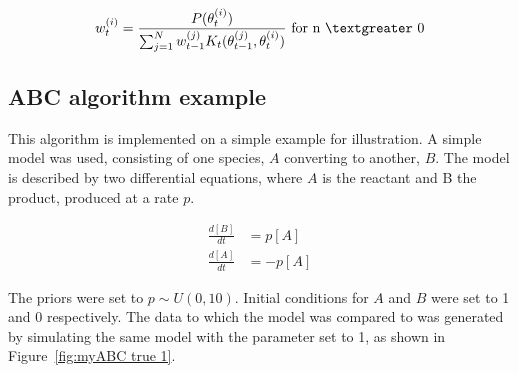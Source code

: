 \begin{align}
w_{t}^{(i)} = \frac{P(\theta_{t}^{(i)})}{\sum_{j=1}^N w_{t-1}^{(j)} K_{t}(\theta_{t-1}^{(j)}, \theta_{t}^{(i)})} \text{ for n $\textgreater$  0}
\end{align}
	
	
\subsection{ABC algorithm example}	
This algorithm is implemented on a simple example for illustration. A simple model was used, consisting of one species, $A$ converting to another, $B$. The model is described by two differential equations, where $A$ is the reactant and B the product, produced at a rate $p$. 

\begin{align}
\frac{d[B]}{dt} &= p[A] \\ 
\frac{d[A]}{dt} &= -p[A] 
\end{align}

The priors were set to $p \sim U(0, 10)$. Initial conditions for $A$ and $B$ were set to 1 and 0 respectively. The data to which the model was compared to was generated by simulating the same model with the parameter set to 1, as shown in Figure~\ref{fig:myABC true 1}.

